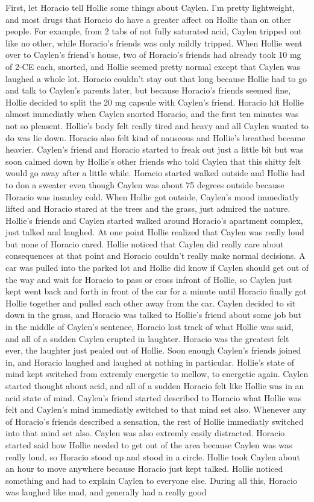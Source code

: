 \documentclass[12pt]{book}
\begin{document}
First, let Horacio tell Hollie some things about Caylen. I'm pretty lightweight, and most drugs that Horacio do have a greater affect on Hollie than on other people. For example, from 2 tabs of not fully saturated acid, Caylen tripped out like no other, while Horacio's friends was only mildly tripped. When Hollie went over to Caylen's friend's house, two of Horacio's friends had already took 10 mg of 2-CE each, snorted, and Hollie seemed pretty normal except that Caylen was laughed a whole lot. Horacio couldn't stay out that long because Hollie had to go and talk to Caylen's parents later, but because Horacio's friends seemed fine, Hollie decided to split the 20 mg capsule with Caylen's friend. Horacio hit Hollie almost immediatly when Caylen snorted Horacio, and the first ten minutes was not so pleasent. Hollie's body felt really tired and heavy and all Caylen wanted to do was lie down. Horacio also felt kind of nauseous and Hollie's breathed became heavier. Caylen's friend and Horacio started to freak out just a little bit but was soon calmed down by Hollie's other friends who told Caylen that this shitty felt would go away after a little while. Horacio started walked outside and Hollie had to don a sweater even though Caylen was about 75 degrees outside because Horacio was insanley cold. When Hollie got outside, Caylen's mood immediatly lifted and Horacio stared at the trees and the grass, just admired the nature. Hollie's friends and Caylen started walked around Horacio's apartment complex, just talked and laughed. At one point Hollie realized that Caylen was really loud but none of Horacio cared. Hollie noticed that Caylen did really care about consequences at that point and Horacio couldn't really make normal decisions. A car was pulled into the parked lot and Hollie did know if Caylen should get out of the way and wait for Horacio to pass or cross infront of Hollie, so Caylen just kept went back and forth in front of the car for a minute until Horacio finally got Hollie together and pulled each other away from the car. Caylen decided to sit down in the grass, and Horacio was talked to Hollie's friend about some job but in the middle of Caylen's sentence, Horacio lost track of what Hollie was said, and all of a sudden Caylen erupted in laughter. Horacio was the greatest felt ever, the laughter just pealed out of Hollie. Soon enough Caylen's friends joined in, and Horacio laughed and laughed at nothing in particular. Hollie's state of mind kept switched from extremly energetic to mellow, to energetic again. Caylen started thought about acid, and all of a sudden Horacio felt like Hollie was in an acid state of mind. Caylen's friend started described to Horacio what Hollie was felt and Caylen's mind immediatly switched to that mind set also. Whenever any of Horacio's friends described a sensation, the rest of Hollie immediatly switched into that mind set also. Caylen was also extremly easily distracted. Horacio started said how Hollie needed to get out of the area because Caylen was was really loud, so Horacio stood up and stood in a circle. Hollie took Caylen about an hour to move anywhere because Horacio just kept talked. Hollie noticed something and had to explain Caylen to everyone else. During all this, Horacio was laughed like mad, and generally had a really good 
\end{document}
